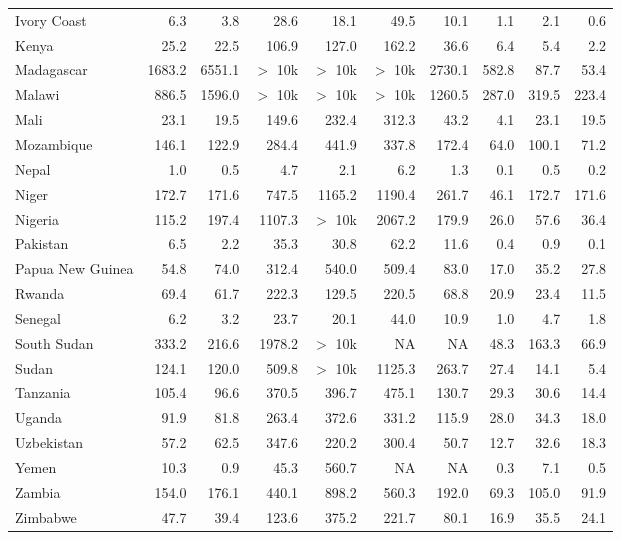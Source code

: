 \begin{table}[b]
{\begin{tabular}[t]{lrrrrrrrrr}
Ivory Coast & 6.3 & 3.8 & 28.6 & 18.1 & 49.5 & 10.1 & 1.1 & 2.1 & 0.6\\
Kenya & 25.2 & 22.5 & 106.9 & 127.0 & 162.2 & 36.6 & 6.4 & 5.4 & 2.2\\
Madagascar & 1683.2 & 6551.1 & $>$ 10k & $>$ 10k & $>$ 10k & 2730.1 & 582.8 & 87.7 & 53.4\\
Malawi & 886.5 & 1596.0 & $>$ 10k & $>$ 10k & $>$ 10k & 1260.5 & 287.0 & 319.5 & 223.4\\
Mali & 23.1 & 19.5 & 149.6 & 232.4 & 312.3 & 43.2 & 4.1 & 23.1 & 19.5\\
Mozambique & 146.1 & 122.9 & 284.4 & 441.9 & 337.8 & 172.4 & 64.0 & 100.1 & 71.2\\
Nepal & 1.0 & 0.5 & 4.7 & 2.1 & 6.2 & 1.3 & 0.1 & 0.5 & 0.2\\
Niger & 172.7 & 171.6 & 747.5 & 1165.2 & 1190.4 & 261.7 & 46.1 & 172.7 & 171.6\\
Nigeria & 115.2 & 197.4 & 1107.3 & $>$ 10k & 2067.2 & 179.9 & 26.0 & 57.6 & 36.4\\
Pakistan & 6.5 & 2.2 & 35.3 & 30.8 & 62.2 & 11.6 & 0.4 & 0.9 & 0.1\\
Papua New Guinea & 54.8 & 74.0 & 312.4 & 540.0 & 509.4 & 83.0 & 17.0 & 35.2 & 27.8\\
Rwanda & 69.4 & 61.7 & 222.3 & 129.5 & 220.5 & 68.8 & 20.9 & 23.4 & 11.5\\
Senegal & 6.2 & 3.2 & 23.7 & 20.1 & 44.0 & 10.9 & 1.0 & 4.7 & 1.8\\
South Sudan & 333.2 & 216.6 & 1978.2 & $>$ 10k & NA & NA & 48.3 & 163.3 & 66.9\\
Sudan & 124.1 & 120.0 & 509.8 & $>$ 10k & 1125.3 & 263.7 & 27.4 & 14.1 & 5.4\\
Tanzania & 105.4 & 96.6 & 370.5 & 396.7 & 475.1 & 130.7 & 29.3 & 30.6 & 14.4\\
Uganda & 91.9 & 81.8 & 263.4 & 372.6 & 331.2 & 115.9 & 28.0 & 34.3 & 18.0\\
Uzbekistan & 57.2 & 62.5 & 347.6 & 220.2 & 300.4 & 50.7 & 12.7 & 32.6 & 18.3\\
Yemen & 10.3 & 0.9 & 45.3 & 560.7 & NA & NA & 0.3 & 7.1 & 0.5\\
Zambia & 154.0 & 176.1 & 440.1 & 898.2 & 560.3 & 192.0 & 69.3 & 105.0 & 91.9\\
Zimbabwe & 47.7 & 39.4 & 123.6 & 375.2 & 221.7 & 80.1 & 16.9 & 35.5 & 24.1\\
\bottomrule
\end{tabular}}
\end{table}